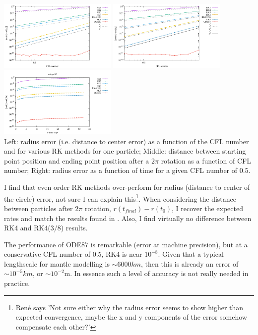 \begin{center}
\includegraphics[width=5.7cm]{python_codes/fieldstone_122/results/exp1/errors.pdf}
\includegraphics[width=5.7cm]{python_codes/fieldstone_122/results/exp1/errors2.pdf}
\includegraphics[width=5.7cm]{python_codes/fieldstone_122/results/exp1/rad.pdf}\\
{\captionfont Left: radius error (i.e. distance to center error) 
as a function of the CFL number and for various RK methods for 
one particle; Middle: distance between starting point position and ending point position 
after a $2\pi$ rotation as a function of CFL number; 
Right: radius error as a function of time for a given CFL number of 0.5.}
\end{center}

I find that even order RK methods over-perform for radius (distance to center of the circle) error, 
not sure I can explain this\footnote{Ren\'e says 'Not sure either why the radius error seems to show 
higher than expected convergence, maybe the x and y components of the error somehow 
compensate each other?'}. When considering the distance between particles after $2\pi$ rotation, 
$r(t_{final})-r(t_0)$, I recover the expected rates and match the results found in \textcite{galh18}. 
Also, I find virtually no difference between RK4 and RK4(3/8) results.

The performance of ODE87 is remarkable (error at machine precision), but at a conservative 
CFL number of 0.5, RK4 is near $10^{-8}$. Given that a typical lengthscale for mantle modelling 
is $\sim 6000km$, then this is already an error of $\sim 10^{-5}km$, or $\sim 10^{-2}$m. 
In essence such a level of accuracy is not really needed in practice.

